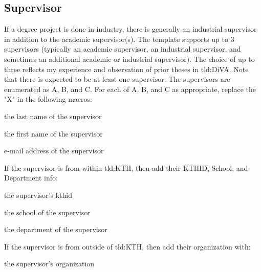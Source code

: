 \subsection{Supervisor}
\label{sec:supervisorMacros}
If a degree project is done in industry, there is generally an industrial supervisor in addition to the academic supervisor(s). The template supports up to 3 supervisors (typically an academic supervisor, an industrial supervisor, and sometimes an additional academic or industrial supervisor). The choice of up to three reflects my experience and observation of prior theses in \gls{tld:DiVA}. Note that there is expected to be at least one supervisor. The supervisors are enumerated as A, B, and C. For each of A, B, and C as appropriate, replace the "X" in the following macros:
\begin{description}[leftmargin=!, labelwidth =\widthof{\texttt{\textbackslash secondAuthorsFirstname\{\}}}]
\item [\texttt{\textbackslash supervisorXsLastname\{\}}] the last name of the supervisor
\item [\texttt{\textbackslash supervisorXsFirstname\{\}}] the first name of the supervisor
\item [\texttt{\textbackslash supervisorXsEmail\{\}}] e-mail address of the supervisor
\end{description}

If the supervisor is from within \gls{tld:KTH}, then add their KTHID, School, and Department info:
\begin{description}[leftmargin=!, labelwidth =\widthof{\texttt{\textbackslash secondAuthorsFirstname\{\}}}]
\item [\texttt{\textbackslash supervisorXsKTHID\{\}}] the supervisor's kthid 
\item [\texttt{\textbackslash supervisorXsSchool\{\}}] the school of the supervisor
\item [\texttt{\textbackslash supervisorXsDepartment\{\}}] the department of the supervisor
\end{description}

If the supervisor is from outside of \gls{tld:KTH}, then add their organization with:
\begin{description}[leftmargin=!, labelwidth =\widthof{\texttt{\textbackslash secondAuthorsFirstname\{\}}}]
\item [\texttt{\textbackslash supervisorXsOrganization\{\}}] the supervisor's organization
\end{description}

